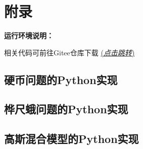 \documentclass[a4paper,12pt]{ctexart} %
\begin{document}
\section{附录}
\textbf{运行环境说明：}

\vspace{10pt}

\vspace{5pt}

相关代码可前往Gitee仓库下载
\href{https://gitee.com/linlangtians/simple-tutorial-and-application-of-em-algorithm.git}{(\textit{点击跳转})}
\subsection{硬币问题的Python实现}\label{sec:coin_code}
\lstset{basicstyle=\footnotesize\ttfamily}


\subsection{桦尺蛾问题的Python实现}\label{sec:peppered_moths_code}
\lstset{basicstyle=\footnotesize\ttfamily}


\subsection{高斯混合模型的Python实现}\label{sec:gmm_code}
\lstset{basicstyle=\footnotesize\ttfamily}

\end{document}
